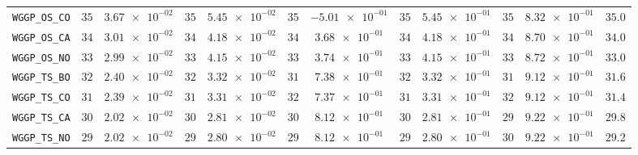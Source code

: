 \begin{table}[H]
\begin{tabularx}{\textwidth}{l||cC|cC|cC|cC|cC||c}
		\texttt{WGGP\_OS\_CO} & $ 35$ & $ \num{3.67e-02}$ & $ 35$ & $ \num{5.45e-02}$ & $ 35$ & $ \num{-5.01e-01}$ & $ 35$ & $ \num{5.45e-01}$ & $ 35$ & $ \num{8.32e-01}$ & $ 35.0$  \\
		\texttt{WGGP\_OS\_CA} & $ 34$ & $ \num{3.01e-02}$ & $ 34$ & $ \num{4.18e-02}$ & $ 34$ & $ \num{3.68e-01}$ & $ 34$ & $ \num{4.18e-01}$ & $ 34$ & $ \num{8.70e-01}$ & $ 34.0$  \\
		\texttt{WGGP\_OS\_NO} & $ 33$ & $ \num{2.99e-02}$ & $ 33$ & $ \num{4.15e-02}$ & $ 33$ & $ \num{3.74e-01}$ & $ 33$ & $ \num{4.15e-01}$ & $ 33$ & $ \num{8.72e-01}$ & $ 33.0$  \\
		\texttt{WGGP\_TS\_BO} & $ 32$ & $ \num{2.40e-02}$ & $ 32$ & $ \num{3.32e-02}$ & $ 31$ & $ \num{7.38e-01}$ & $ 32$ & $ \num{3.32e-01}$ & $ 31$ & $ \num{9.12e-01}$ & $ 31.6$  \\
		\texttt{WGGP\_TS\_CO} & $ 31$ & $ \num{2.39e-02}$ & $ 31$ & $ \num{3.31e-02}$ & $ 32$ & $ \num{7.37e-01}$ & $ 31$ & $ \num{3.31e-01}$ & $ 32$ & $ \num{9.12e-01}$ & $ 31.4$  \\
		\texttt{WGGP\_TS\_CA} & $ 30$ & $ \num{2.02e-02}$ & $ 30$ & $ \num{2.81e-02}$ & $ 30$ & $ \num{8.12e-01}$ & $ 30$ & $ \num{2.81e-01}$ & $ 29$ & $ \num{9.22e-01}$ & $ 29.8$  \\
		\texttt{WGGP\_TS\_NO} & $ 29$ & $ \num{2.02e-02}$ & $ 29$ & $ \num{2.80e-02}$ & $ 29$ & $ \num{8.12e-01}$ & $ 29$ & $ \num{2.80e-01}$ & $ 30$ & $ \num{9.22e-01}$ & $ 29.2$  \\
	\end{tabularx}
\end{table}
